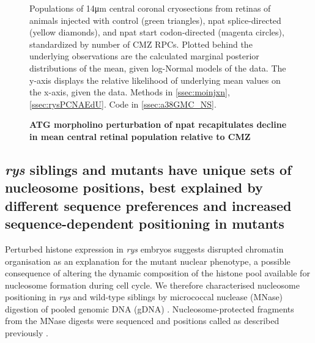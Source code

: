 \documentclass{ut-thesis}
\begin{document}
\begin{NoHyper}
\begin{figure}[!h]
    \caption{{\bf ATG morpholino perturbation of npat recapitulates decline in mean  central retinal population relative to CMZ}}
    Populations of 14\si{\micro\metre} central coronal cryosections from retinas of animals injected with control (green triangles), npat splice-directed (yellow diamonds), and npat start codon-directed (magenta circles), standardized by number of CMZ RPCs. Plotted behind the underlying observations are the calculated marginal posterior distributions of the mean, given log-Normal models of the data. The y-axis displays the relative likelihood of underlying mean values on the x-axis, given the data.
    Methods in \autoref{ssec:moinjxn}, \autoref{ssec:rysPCNAEdU}.
    Code in \autoref{ssec:a38GMC_NS}.
    \label{morphonucstudy}
\end{figure}

\subsection{\textit{rys} siblings and mutants have unique sets of nucleosome positions, best explained by different sequence preferences and increased sequence-dependent positioning in mutants}
 Perturbed histone expression in \textit{rys} embryos suggests disrupted chromatin organisation as an explanation for the mutant nuclear phenotype, a possible consequence of altering the dynamic composition of the histone pool available for nucleosome formation during cell cycle. We therefore characterised nucleosome positioning in \textit{rys} and wild-type siblings by micrococcal nuclease (MNase) digestion of pooled genomic DNA (gDNA) \cite{Cui2012}. Nucleosome-protected fragments from the MNase digests were sequenced and positions called as described previously \cite{Chen2013}.


\end{NoHyper}
\end{document}
